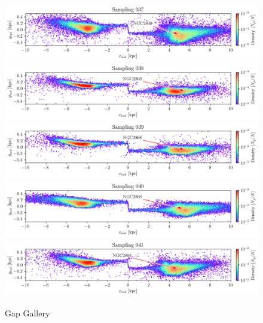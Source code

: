 \documentclass[draft]{aa}
\begin{document}
\begin{appendix}
    \begin{figure}
      \centering
      \includegraphics[width=\linewidth]{gallery_of_gaps_monte-carlo-037.png}
      \includegraphics[width=\linewidth]{gallery_of_gaps_monte-carlo-038.png}
      \includegraphics[width=\linewidth]{gallery_of_gaps_monte-carlo-039.png}
      \includegraphics[width=\linewidth]{gallery_of_gaps_monte-carlo-040.png}
      \includegraphics[width=\linewidth]{gallery_of_gaps_monte-carlo-041.png}      
      \caption{Gap Gallery}
      \label{fig:gallery9}
    \end{figure}        
    

\end{appendix}
\end{document}

